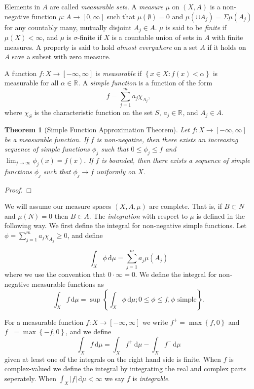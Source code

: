 \documentclass[12pt]{report}
\newtheorem{theorem}{Theorem}[section]
\numberwithin{definition}{section}
\begin{document}
Elements in $A$ are called \textit{measurable sets}.
A \textit{measure}  $\mu$ on $(X,A)$ is a non-negative function $ \mu : A \to [0,\infty] $ such that $\mu(\emptyset) = 0$ and $\mu(\cup A_{j}) = \Sigma \mu(A_{j})$ for any countably many, mutually disjoint $A_{j} \in A$.
$\mu$ is said to be  \textit{finite} if $\mu(X) < \infty$, and $\mu$ is $\sigma$-finite if $X$ is a countable union of sets in $A$ with finite measures.
A property is said to hold \textit{almost everywhere} on a set $A$ if it holds on $A$ save a subset with zero measure.

A function $ f : X \to [-\infty, \infty] $ is \textit{measurable} if $ \left\{ x \in X : f(x) < \alpha \right\}$ is measurable for all $\alpha \in \mathbb{R}^{} $.
A \textit{simple function}  is a function of the form
\[
f = \sum_{j=1}^m a_{j}\chi_{A_{j}} 
,\] 
where $\chi_{S}$ is the characteristic function on the set $S$, $a_{j} \in \mathbb{R}^{} $, and $A_{j} \in A$.

\begin{theorem}[Simple Function Approximation Theorem]
  Let $ f : X \to [-\infty, \infty] $ be a measurable function.
  If $f$ is non-negative, then there exists an increasing sequence of simple functions $\phi_{j}$ such that $0 \leq \phi_{j} \leq f$ and $\lim_{j \to \infty} \phi_{j}(x) = f(x)$.
  If $f$ is bounded, then there exists a sequence of simple functions $\phi_{j}$ such that $\phi_{j} \to f$ uniformly on $X$.
\end{theorem}

\begin{proof}
\end{proof}

We will assume our measure spaces $(X,A,\mu)$ are complete.
That is, if $B \subset N$ and $\mu(N) = 0$ then $B \in A$.
The \textit{integration} with respect to $\mu$ is defined in the following way.
We first define the integral for non-negative simple functions.
Let $\phi = \sum_{j=1}^m a_{j} \chi_{A_{j}} \geq 0$, and define 

\[
\int_{ X} \! \phi \, \mathrm{d}\mu = \sum_{j=1}^m a_{j} \mu(A_{j})
\] 
where we use the convention that $0 \cdot \infty = 0$.
We define the integral for non-negative measurable functions as
\[
  \int_{ X} \! f \, \mathrm{d}\mu = \sup \left\{ \int_{ X} \! \phi \, \mathrm{d}\mu ; 0 \leq \phi \leq f, \phi \text{ simple}  \right\} 
.\] 

For a measurable function $ f : X \to [-\infty,\infty] $ we write $f^{+} = \max \left\{ f,0 \right\}$ and $f^{-} = \max \left\{ -f,0 \right \}$, and we define
\[
\int_{ X} \! f \, \mathrm{d}\mu = \int_{ X} \! f^{+} \, \mathrm{d}\mu - \int_{ X} \! f^{-} \, \mathrm{d}\mu  
\] 
given at least one of the integrals on the right hand side is finite.
When $f$ is complex-valued we define the integral by integrating the real and complex parts seperately.
When $\int_{ X} \! |f| \, \mathrm{d}\mu < \infty $ we say $f$ is \textit{integrable}.
\end{document}
